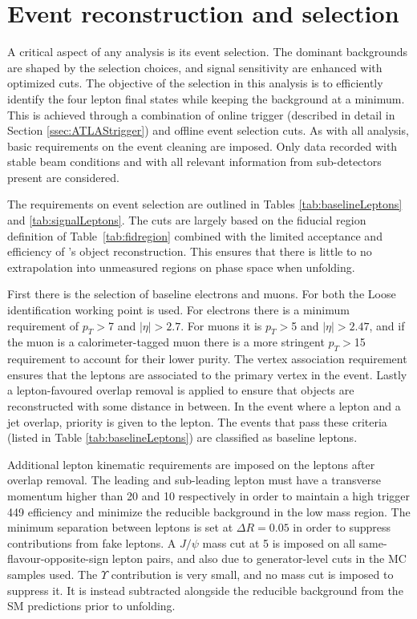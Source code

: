 \section{Event reconstruction and selection}
\label{sec:eventselection}
A critical aspect of any analysis is its event selection. The dominant backgrounds are shaped by the selection choices, and signal sensitivity are enhanced with optimized cuts. The objective of the selection in this analysis is to efficiently identify the four lepton final states while keeping the background at a minimum. This is achieved through a combination of online trigger (described in detail in Section \ref{ssec:ATLAStrigger}) and offline event selection cuts. As with all \ATLAS analysis, basic requirements on the event cleaning are imposed. Only data recorded with stable beam conditions and with all relevant information from sub-detectors present are considered. 

The requirements on event selection are outlined in Tables \ref{tab:baselineLeptons} and \ref{tab:signalLeptons}. The cuts are largely based on the fiducial region definition of Table~\ref{tab:fidregion} combined with the limited acceptance and efficiency of \ATLAS's object reconstruction. This ensures that there is little to no extrapolation into unmeasured regions on phase space when unfolding. 

First there is the selection of baseline electrons and muons. For both the Loose identification working point is used. For electrons there is a minimum requirement of $p_T>$\unit{7}{\GeV} and $|\eta|>2.7$. For muons it is $p_T>$\unit{5}{\GeV} and $|\eta|>2.47$, and if the muon is a calorimeter-tagged muon there is a more stringent $p_T>$\unit{15}{\GeV} requirement to account for their lower purity. The vertex association requirement ensures that the leptons are associated to the primary vertex in the event. Lastly a lepton-favoured overlap removal is applied to ensure that objects are reconstructed with some distance in between. In the event where a lepton and a jet overlap, priority is given to the lepton. The events that pass these criteria (listed in Table \ref{tab:baselineLeptons}) are classified as baseline leptons.

Additional lepton kinematic requirements are imposed on the leptons after overlap removal. The leading and sub-leading lepton must have a transverse momentum higher than \unit{20}{\GeV} and \unit{10}{\GeV} respectively in order to maintain a high trigger
449 efficiency and minimize the reducible background in the low mass region. The minimum separation between leptons is set at $\Delta R=0.05$ in order to suppress contributions from fake leptons. A $J/\psi$ mass cut at \unit{5}{\GeV} is imposed on all same-flavour-opposite-sign lepton pairs, and also due to generator-level cuts in the MC samples used. The $\Upsilon$ contribution is very small, and no mass cut is imposed to suppress it. It is instead subtracted alongside the reducible background from the SM predictions prior to unfolding.

